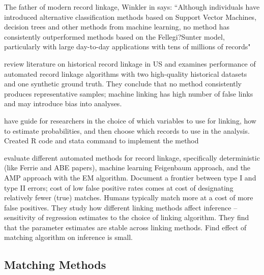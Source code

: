 \documentclass[12pt]{article}
\begin{document}
The father of modern record linkage, Winkler in \cite{christen2012} says: ``Although individuals have introduced alternative classification methods based on Support Vector Machines, decision trees and other
methods from machine learning, no method has consistently outperformed methods
based on the Fellegi?Sunter model, particularly with large day-to-day applications
with tens of millions of records"

\cite{bailey2017} review literature on historical record linkage in US and examines performance of automated record linkage algorithms with two high-quality historical datasets and one synthetic ground truth.  They conclude that no method consistently produces representative samples; machine linking has high number of false links and may introduce bias into analyses.  

\cite{arp2018} have guide for researchers in the choice of which variables to use for linking, how to estimate probabilities, and then choose which records to use in the analysis.  Created R code and stata command to implement the method

\cite{abe2019} evaluate different automated methods for record linkage, specifically deterministic (like Ferrie and ABE papers), machine learning Feigenbaum approach, and the AMP approach with the EM algorithm.  Document a frontier between type I and type II errors; cost of low false positive rates comes at cost of designating relatively fewer (true) matches.  Humans typically match more at a cost of more false positives.  They study how different linking methods affect inference -- sensitivity of regression estimates to the choice of linking algorithm.  They find that the parameter estimates are stable across linking methods.  Find effect of matching algorithm on inference is small. 

\subsection{Matching Methods}
\end{document}
